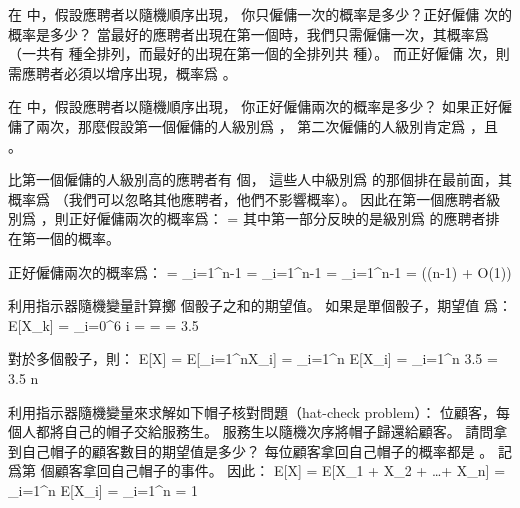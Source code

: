 \startsection[
  title={Indicator random variables},
]

\startEXERCISE
在  中，假設應聘者以隨機順序出現，
你只僱傭一次的概率是多少？正好僱傭  次的概率是多少？
\stopEXERCISE
\startANSWER
當最好的應聘者出現在第一個時，我們只需僱傭一次，其概率爲  （一共有  種全排列，而最好的出現在第一個的全排列共  種）。
而正好僱傭  次，則需應聘者必須以增序出現，概率爲 。
\stopANSWER

\startEXERCISE
在  中，假設應聘者以隨機順序出現，
你正好僱傭兩次的概率是多少？
\stopEXERCISE
\startANSWER
如果正好僱傭了兩次，那麼假設第一個僱傭的人級別爲 ，
第二次僱傭的人級別肯定爲 ，且 。

比第一個僱傭的人級別高的應聘者有  個，
這些人中級別爲  的那個排在最前面，其概率爲 
（我們可以忽略其他應聘者，他們不影響概率）。
因此在第一個應聘者級別爲 ，則正好僱傭兩次的概率爲：
\startformula
{} = 
\stopformula
其中第一部分反映的是級別爲  的應聘者排在第一個的概率。

正好僱傭兩次的概率爲：
\startformula\startmathalignment
\NC {} \NC= \sum_{i=1}^{n-1} \NR
\NC        \NC= \sum_{i=1}^{n-1} \NR
\NC        \NC=  \sum_{i=1}^{n-1} \NR
\NC        \NC=  (\lg(n-1) + O(1)) \NR
\stopmathalignment\stopformula
\stopANSWER

\startEXERCISE
利用指示器隨機變量計算擲  個骰子之和的期望值。
\stopEXERCISE
\startANSWER
如果是單個骰子，期望值  爲：
\startformula\startmathalignment
\NC E[X_k] \NC= \sum_{i=0}^6 i  \NR
\NC        \NC=  \NR
\NC        \NC=  \NR
\NC        \NC= 3.5 \NR
\stopmathalignment\stopformula

對於多個骰子，則：
\startformula\startmathalignment
\NC E[X] \NC= E[\sum_{i=1}^nX_i] \NR
\NC      \NC= \sum_{i=1}^n E[X_i] \NR
\NC      \NC= \sum_{i=1}^n 3.5 \NR
\NC      \NC= 3.5 \cdot n \NR
\stopmathalignment\stopformula
\stopANSWER

\startEXERCISE
利用指示器隨機變量來求解如下{\EMP 帽子核對問題}（hat-check problem）：
 位顧客，每個人都將自己的帽子交給服務生。
服務生以隨機次序將帽子歸還給顧客。
請問拿到自己帽子的顧客數目的期望值是多少？
\stopEXERCISE
\startANSWER
每位顧客拿回自己帽子的概率都是 。
記  爲第  個顧客拿回自己帽子的事件。
因此：
\startformula
E[X] = E[X_1 + X_2 + \ldots + X_n]
         = \sum_{i=1}^n E[X_i]
         = \sum_{i=1}^n 
         = 1
\stopformula
\stopANSWER

